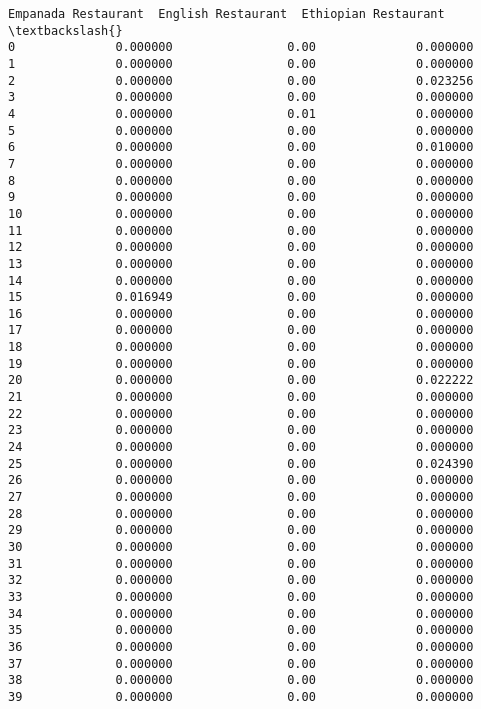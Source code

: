 \documentclass[11pt]{article}
\begin{document}
\begin{tcolorbox}[breakable, size=fbox, boxrule=.5pt, pad at break*=1mm, opacityfill=0]
\begin{Verbatim}[commandchars=\\\{\}]
    Empanada Restaurant  English Restaurant  Ethiopian Restaurant  \textbackslash{}
0              0.000000                0.00              0.000000
1              0.000000                0.00              0.000000
2              0.000000                0.00              0.023256
3              0.000000                0.00              0.000000
4              0.000000                0.01              0.000000
5              0.000000                0.00              0.000000
6              0.000000                0.00              0.010000
7              0.000000                0.00              0.000000
8              0.000000                0.00              0.000000
9              0.000000                0.00              0.000000
10             0.000000                0.00              0.000000
11             0.000000                0.00              0.000000
12             0.000000                0.00              0.000000
13             0.000000                0.00              0.000000
14             0.000000                0.00              0.000000
15             0.016949                0.00              0.000000
16             0.000000                0.00              0.000000
17             0.000000                0.00              0.000000
18             0.000000                0.00              0.000000
19             0.000000                0.00              0.000000
20             0.000000                0.00              0.022222
21             0.000000                0.00              0.000000
22             0.000000                0.00              0.000000
23             0.000000                0.00              0.000000
24             0.000000                0.00              0.000000
25             0.000000                0.00              0.024390
26             0.000000                0.00              0.000000
27             0.000000                0.00              0.000000
28             0.000000                0.00              0.000000
29             0.000000                0.00              0.000000
30             0.000000                0.00              0.000000
31             0.000000                0.00              0.000000
32             0.000000                0.00              0.000000
33             0.000000                0.00              0.000000
34             0.000000                0.00              0.000000
35             0.000000                0.00              0.000000
36             0.000000                0.00              0.000000
37             0.000000                0.00              0.000000
38             0.000000                0.00              0.000000
39             0.000000                0.00              0.000000


\end{Verbatim}
\end{tcolorbox}
\end{document}

